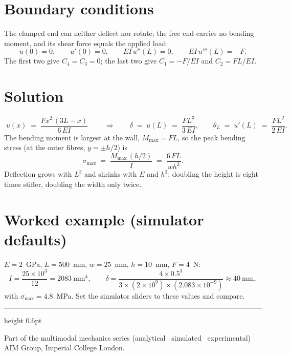 \documentclass[10pt,a4paper]{article}
\begin{document}
\section*{Boundary conditions}
The clamped end can neither deflect nor rotate; the free end carries no bending
moment, and its shear force equals the applied load:
\begin{equation}
u(0) = 0, \qquad u'(0) = 0, \qquad EI\,u''(L) = 0, \qquad EI\,u'''(L) = -F .
\end{equation}
The first two give $C_4 = C_3 = 0$; the last two give $C_1 = -F/EI$ and
$C_2 = FL/EI$.

\section*{Solution}
\begin{equation}
\boxed{\; u(x) \;=\; \frac{F x^2 \, (3L - x)}{6\,EI} \;}
\qquad\Rightarrow\qquad
\delta \;=\; u(L) \;=\; \frac{F L^3}{3\,EI},
\qquad
\theta_L \;=\; u'(L) \;=\; \frac{F L^2}{2\,EI}.
\end{equation}
The bending moment is largest at the wall, $M_{\max} = FL$, so the peak bending
stress (at the outer fibres, $y = \pm h/2$) is
\begin{equation}
\sigma_{\max} \;=\; \frac{M_{\max}\,(h/2)}{I} \;=\; \frac{6\,F L}{w h^2}.
\end{equation}
Deflection grows with $L^3$ and shrinks with $E$ and $h^3$: doubling the height
is eight times stiffer, doubling the width only twice.

\section*{Worked example (simulator defaults)}
$E = 2$~GPa, $L = 500$~mm, $w = 25$~mm, $h = 10$~mm, $F = 4$~N:
\begin{equation}
I = \frac{25 \times 10^3}{12} = 2083~\text{mm}^4, \qquad
\delta = \frac{4 \times 0.5^3}{3 \times (2\times10^{9}) \times (2.083\times10^{-9})}
\approx 40~\text{mm},
\end{equation}
with $\sigma_{\max} = 4.8$~MPa. Set the simulator sliders to these values and
compare.

\vfill
{\color{celline}\hrule height 0.6pt}
\smallskip
{\footnotesize\textcolor{celdark}{Part of the multimodal mechanics series
(analytical \textperiodcentered\ simulated \textperiodcentered\ experimental)
\,\textperiodcentered\, AIM Group, Imperial College London.}}
\end{document}
